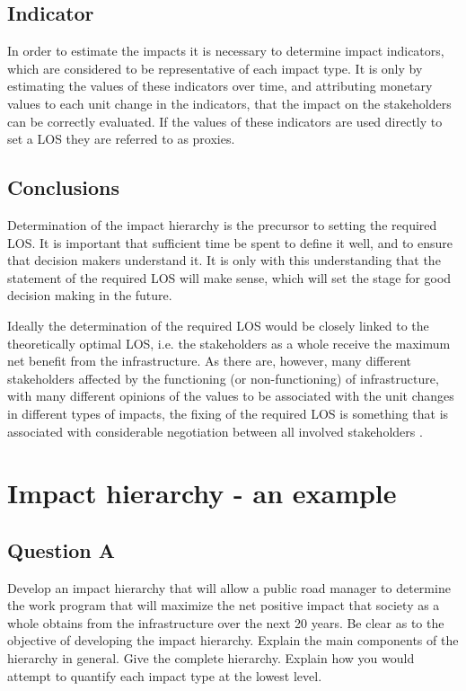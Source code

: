 \subsection{Indicator}
In order to estimate the impacts it is necessary to determine impact indicators, which are considered to be representative of each impact type. It is only by estimating the values of these indicators over time, and attributing monetary values to each unit change in the indicators, that the impact on the stakeholders can be correctly evaluated. If the values of these indicators are used directly to set a LOS they are referred to as proxies.

\subsection{Conclusions}
Determination of the impact hierarchy is the precursor to setting the required LOS. It is important that sufficient time be spent to define it well, and to ensure that decision makers understand it. It is only with this understanding that the statement of the required LOS will make sense, which will set the stage for good decision making in the future.

Ideally the determination of the required LOS would be closely linked to the theoretically optimal LOS, i.e. the stakeholders as a whole receive the maximum net benefit from the infrastructure. As there are, however, many different stakeholders affected by the functioning (or non-functioning) of infrastructure, with many different opinions of the values to be associated with the unit changes in different types of impacts, the fixing of the required LOS is something that is associated with considerable negotiation between all involved stakeholders \citep{Brauers204}.

\section{Impact hierarchy - an example}
\subsection{Question A}

Develop an impact hierarchy that will allow a public road manager to determine the work program that will maximize the net positive impact that society as a whole obtains from the infrastructure over the next 20 years. Be clear as to the objective of developing the impact hierarchy. Explain the main components of the hierarchy in general. Give the complete hierarchy. Explain how you would attempt to quantify each impact type at the lowest level. 

